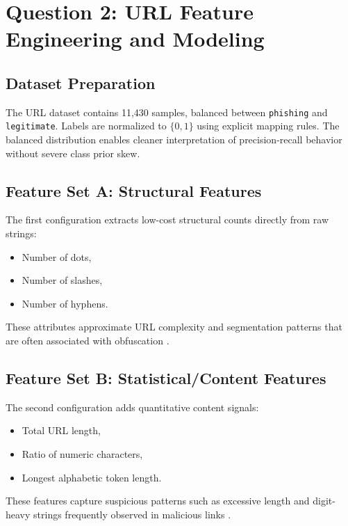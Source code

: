 \section{Question 2: URL Feature Engineering and Modeling}

\subsection{Dataset Preparation}

The URL dataset contains 11,430 samples, balanced between \texttt{phishing} and \texttt{legitimate}. Labels are normalized to $\{0,1\}$ using explicit mapping rules. The balanced distribution enables cleaner interpretation of precision-recall behavior without severe class prior skew.

\subsection{Feature Set A: Structural Features}

The first configuration extracts low-cost structural counts directly from raw strings:
\begin{itemize}
    \item Number of dots,
    \item Number of slashes,
    \item Number of hyphens.
\end{itemize}

These attributes approximate URL complexity and segmentation patterns that are often associated with obfuscation \cite{chandrasekaran2006phishing}.

\subsection{Feature Set B: Statistical/Content Features}

The second configuration adds quantitative content signals:
\begin{itemize}
    \item Total URL length,
    \item Ratio of numeric characters,
    \item Longest alphabetic token length.
\end{itemize}

These features capture suspicious patterns such as excessive length and digit-heavy strings frequently observed in malicious links \cite{ma2011learning,aburrous2010intelligent}.

